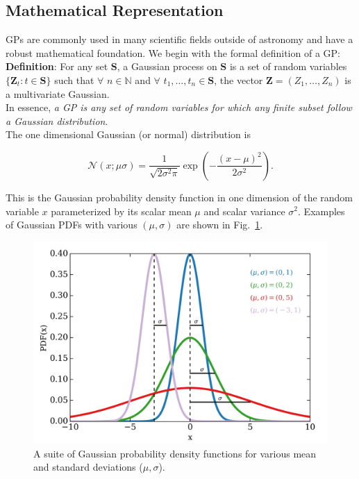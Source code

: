 \subsection{Mathematical Representation}
GPs are commonly used in many scientific fields 
outside of astronomy and have a robust mathematical foundation. 
We begin with the formal definition of a GP: \\

\textbf{Definition}: For any set $\mathbf{S}$, a Gaussian process on $\mathbf{S}$ is a set 
of random variables $\{\mathbf{Z}_t: t \in \mathbf{S}\}$ such that $\forall \hspace{4pt} n \in \mathbb{N}$ 
and $\forall \hspace{4pt} t_1,\dots,t_n \in \mathbf{S}$, the vector $\mathbf{Z}=(Z_1,\dots,Z_n)$ is a 
multivariate Gaussian. \\

\noindent In essence, \emph{a GP is any set of random variables for which any finite subset follow 
a Gaussian distribution}. \\

The one dimensional Gaussian (or normal) distribution is 

\begin{equation}
\mathcal{N}(x;\mu \sigma) = \frac{1}{\sqrt{2\sigma^2\pi}}\exp{\left( -\frac{(x-\mu)^2}{2\sigma^2} \right)}.
\label{eq:1dgaussian}
\end{equation}

\noindent This is the Gaussian probability density function in one dimension 
of the random variable $x$ parameterized 
by its scalar mean $\mu$ and scalar variance $\sigma^2$. Examples of Gaussian PDFs with 
various $(\mu,\sigma)$ are shown in Fig.~\ref{fig:gaussians}. \\

\begin{figure}
\centering
\includegraphics[scale=.45]{figures/gaussians.png}
\caption{A suite of Gaussian probability density functions for various mean and 
standard deviations ($\mu,\sigma$). 
\label{fig:gaussians}}
\end{figure}

